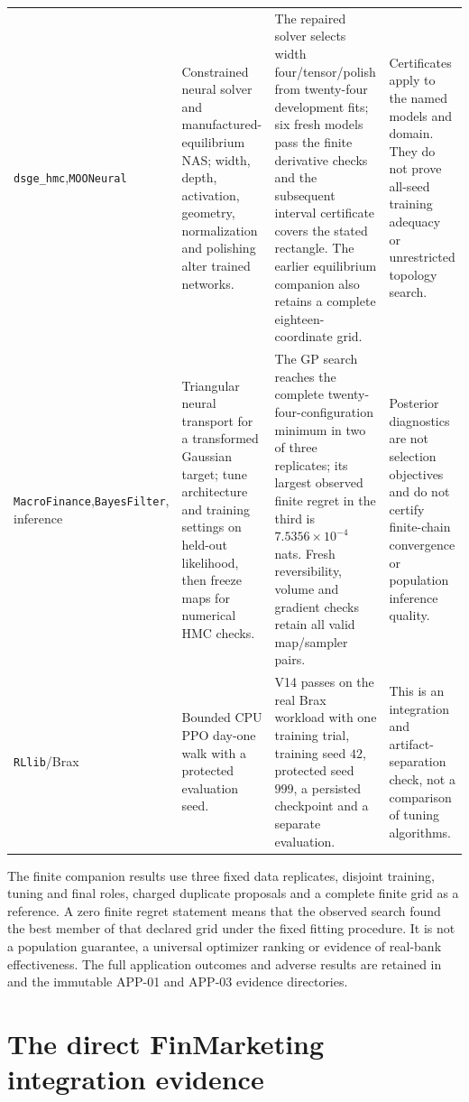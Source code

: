 \begin{longtable}{@{}p{}p{}p{}p{}@{}}
\texttt{dsge\_hmc},\newline \texttt{MOONeural} & Constrained neural solver and manufactured-equilibrium NAS; width, depth, activation, geometry, normalization and polishing alter trained networks. & The repaired solver selects width four/tensor/polish from twenty-four development fits; six fresh models pass the finite derivative checks and the subsequent interval certificate covers the stated rectangle. The earlier equilibrium companion also retains a complete eighteen-coordinate grid. & Certificates apply to the named models and domain. They do not prove all-seed training adequacy or unrestricted topology search.\\
\texttt{MacroFinance},\newline \texttt{BayesFilter}, inference & Triangular neural transport for a transformed Gaussian target; tune architecture and training settings on held-out likelihood, then freeze maps for numerical HMC checks. & The GP search reaches the complete twenty-four-configuration minimum in two of three replicates; its largest observed finite regret in the third is $7.5356\times10^{-4}$ nats. Fresh reversibility, volume and gradient checks retain all valid map/sampler pairs. & Posterior diagnostics are not selection objectives and do not certify finite-chain convergence or population inference quality.\\
\texttt{RLlib}/Brax & Bounded CPU PPO day-one walk with a protected evaluation seed. & V14 passes on the real Brax workload with one training trial, training seed $42$, protected seed $999$, a persisted checkpoint and a separate evaluation. & This is an integration and artifact-separation check, not a comparison of tuning algorithms.\\
\bottomrule
\end{longtable}

The finite companion results use three fixed data replicates, disjoint training,
tuning and final roles, charged duplicate proposals and a complete finite grid
as a reference. A zero finite regret statement means that the observed search
found the best member of that declared grid under the fixed fitting procedure.
It is not a population guarantee, a universal optimizer ranking or evidence of
real-bank effectiveness. The full application outcomes and adverse results are
retained in  and the immutable APP-01
and APP-03 evidence directories.

\section{The direct FinMarketing integration evidence}

